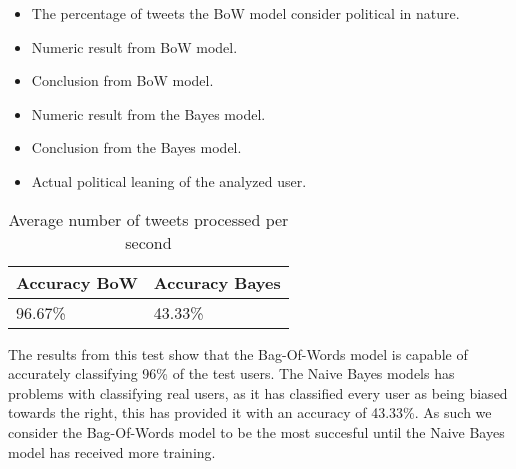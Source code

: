 \begin{itemize}
  \item The percentage of tweets the BoW model
consider political in nature.
\item Numeric result from BoW model.
\item Conclusion from BoW model.
\item Numeric result from the Bayes model.
\item Conclusion from the Bayes model.
\item Actual political leaning of the analyzed user.
\end{itemize}


\begin{table}[H]\centering
{}
\caption{Results from the speed test}
\label{speedTestReslabel}
\end{table}




\begin{table}[H]\centering
\begin{tabular}{|l|l|}\hline
\textbf{Accuracy BoW}	&	\textbf{Accuracy Bayes}	\\\hline
96.67\%					&	43.33\%					\\\hline	
\end{tabular}
\caption{Average number of tweets processed per second}
\label{AccPercent}
\end{table}

The results from this test show that the Bag-Of-Words model is capable of
accurately classifying 96\% of the test users. The Naive Bayes models has
problems with classifying real users, as it has classified every user as being
biased towards the right, this has provided it with an accuracy of 43.33\%. As
such we consider the Bag-Of-Words model to be the most succesful until the Naive
Bayes model has received more training.

